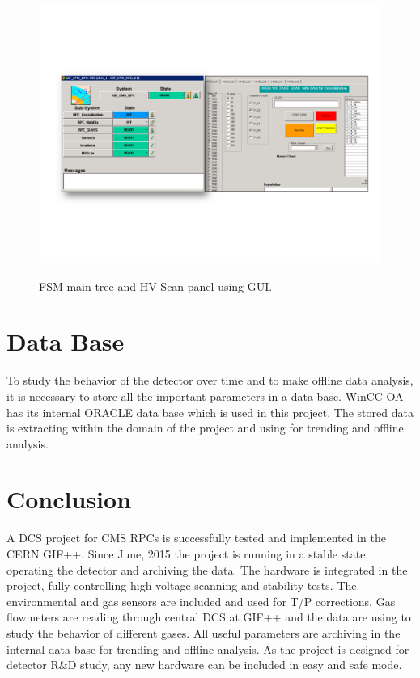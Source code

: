 \documentclass[a4paper,11pt]{article}
\begin{document}
\begin{figure}[H]
\centering
\hspace{-0.50cm}
\includegraphics[scale=0.66,trim=30 150 30 140,clip]{images/GUI.png}\\
 \caption{FSM main tree and HV Scan panel using GUI.}
\label{gui}
\end{figure}

\section{Data Base}
To study the behavior of the detector over time and to make offline data analysis, it is necessary to store all the important parameters in a data base. WinCC-OA has its internal ORACLE data base which is used in this project. The stored data is extracting within the domain of the project and using for trending and offline analysis.  

\section{Conclusion} 
A DCS project for CMS RPCs is successfully tested and implemented in the CERN GIF++. Since June, 2015 the project is running in a stable state, operating the detector and archiving the data. The hardware is integrated in the project, fully controlling high voltage scanning and stability tests. The environmental and gas sensors are included and used for T/P corrections. Gas flowmeters are reading through central DCS at GIF++ and the data are using to study the behavior of different gases. All useful parameters are archiving in the internal data base for trending and offline analysis. As the project is designed for detector R\&D study, any new hardware can be included in easy and safe mode.  
\end{document}
